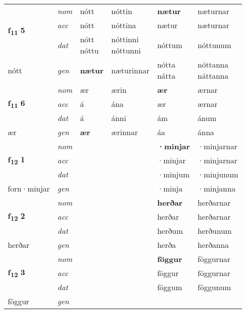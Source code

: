 \begin{longtable}[l]{X>{\footnotesize\itshape}XXXXX}
\multirow{3}{*}{{{\textbf{f{\textsubscript{11}}} \Large{\textbf{5}}}}} & nom & nótt & nóttin & \textbf{nætur} & næturnar \\*
 & acc & nótt & nóttina & nætur & næturnar \\*
 & dat & \specialcell{nótt\\ nóttu} & \specialcell{nóttinni\\ nóttunni} & nóttum & nóttunum \\*
 {\footnotesize{nótt}} & gen & \textbf{nætur} & næturinnar & \specialcell{nótta\\ nátta} & \specialcell{nóttanna\\ náttanna} \\
\midrule

\multirow{3}{*}{{{\textbf{f{\textsubscript{11}}} \Large{\textbf{6}}}}} & nom & ær & ærin & \textbf{ær} & ærnar \\*
 & acc & á & ána & ær & ærnar \\*
 & dat & á & ánni & ám & ánum \\*
 {\footnotesize{ær}} & gen & \textbf{ær} & ærinnar & áa & ánna \\
\midrule

\multirow{3}{*}{{{\textbf{f{\textsubscript{12}}} \Large{\textbf{1}}}}} & nom &  &  & \textbf{·minjar} & ·minjarnar \\*
 & acc &  &  & ·minjar & ·minjarnar \\*
 & dat &  &  & ·minjum & ·minjunum \\*
 {\footnotesize{forn\allowbreak ·minjar}} & gen & \textbf{} &  & ·minja & ·minjanna \\
\midrule

\multirow{3}{*}{{{\textbf{f{\textsubscript{12}}} \Large{\textbf{2}}}}} & nom &  &  & \textbf{herðar} & herðarnar \\*
 & acc &  &  & herðar & herðarnar \\*
 & dat &  &  & herðum & herðunum \\*
 {\footnotesize{herðar}} & gen & \textbf{} &  & herða & herðanna \\
\midrule

\multirow{3}{*}{{{\textbf{f{\textsubscript{12}}} \Large{\textbf{3}}}}} & nom &  &  & \textbf{föggur} & föggurnar \\*
 & acc &  &  & föggur & föggurnar \\*
 & dat &  &  & föggum & föggunum \\*
 {\footnotesize{föggur}} & gen & \textbf{} &  &  &  \\
\midrule


\end{longtable}
